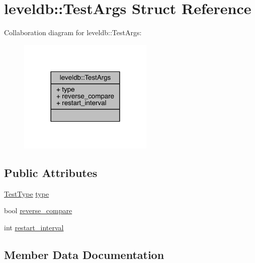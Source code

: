 \hypertarget{structleveldb_1_1_test_args}{}\section{leveldb\+:\+:Test\+Args Struct Reference}
\label{structleveldb_1_1_test_args}


Collaboration diagram for leveldb\+:\+:Test\+Args\+:\nopagebreak
\begin{figure}[H]
\begin{center}
\leavevmode
\includegraphics[width=182pt]{structleveldb_1_1_test_args__coll__graph}
\end{center}
\end{figure}
\subsection*{Public Attributes}
\begin{DoxyCompactItemize}
\item 
\hyperlink{namespaceleveldb_aefcb8349b9101fe6eeff98a1682f1342}{Test\+Type} \hyperlink{structleveldb_1_1_test_args_a1c2c14e2506bf6c238a2685c38eb16ac}{type}
\item 
bool \hyperlink{structleveldb_1_1_test_args_ab4c8bef944a4ddf845378f1fce2b6c22}{reverse\+\_\+compare}
\item 
int \hyperlink{structleveldb_1_1_test_args_a233f5e5e56ff872e26f543585824df1d}{restart\+\_\+interval}
\end{DoxyCompactItemize}


\subsection{Member Data Documentation}
\hypertarget{structleveldb_1_1_test_args_a233f5e5e56ff872e26f543585824df1d}{}
